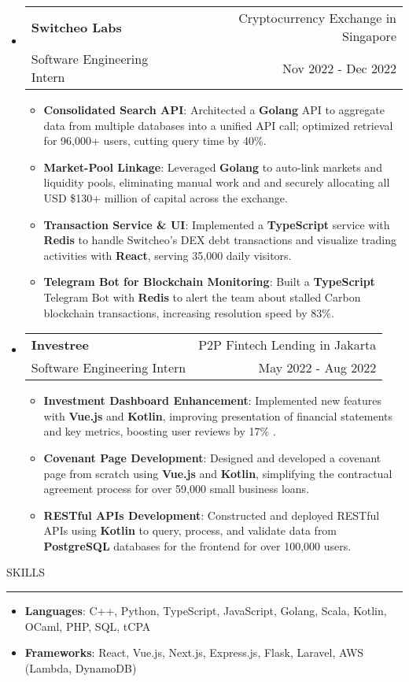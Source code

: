 \documentclass[letterpaper, 11pt]{article}
\makeatletter
\def\sectionlineskip{\medskip}
\def\sectionskip{\medskip}
\def \entryspacing {-0pt}
\newcommand{\SectionHeading}[1]{
  \sectionskip
  \raggedright\raggedbottom\MakeUppercase{\large{#1}}
  \sectionlineskip
  \hrule
  \color{black}
}
\newcommand{\ResumeEntryTSDL}[4]{
  \vspace{-1pt}\item
    \begin{tabular*}{\textwidth}[t]{l@{\extracolsep{\fill}}r} 
      \textbf{#1} & #2 \\
      #3 & #4 \\
    \end{tabular*}\vspace{-4pt}
}
\newcommand{\ResumeItem}[2]{
  \item{
    \textbf{#1}{: #2 \vspace{-2pt}}
  }
}
\newcommand{\ResumeSubItem}[2]{\ResumeItem{#1}{#2}\vspace{-4pt}}
\newcommand{\ResumeEntryStart}{\begin{itemize}[leftmargin=2mm, label={}]}
\newcommand{\ResumeEntryEnd}{\end{itemize}\vspace{-7pt}}
\newcommand{\ResumeItemListStart}{\begin{itemize}[leftmargin=5mm, label=$\bullet$]}
\newcommand{\ResumeItemListEnd}{\end{itemize}}
\newcommand{\ProjectItemListStart}{\begin{itemize}[leftmargin=*, label=$\bullet$]}
\newcommand{\ProjectItemListEnd}{\end{itemize}\vspace{\entryspacing}}
\makeatother
\begin{document}
  \ResumeEntryStart
    \ResumeEntryTSDL{Switcheo Labs}{Cryptocurrency Exchange in Singapore}{Software Engineering Intern}{Nov 2022 - Dec 2022}
    \ResumeItemListStart
    \ResumeItem{Consolidated Search API}
      {Architected a \textbf{Golang} API to aggregate data from multiple databases into a unified API call; optimized retrieval for 96,000+ users, cutting query time by 40\%.}
    \ResumeItem{Market-Pool Linkage}
      {Leveraged \textbf{Golang} to auto-link markets and liquidity pools, eliminating manual work and and securely allocating all USD \$130+ million of capital across the exchange.}
    \ResumeItem{Transaction Service \& UI}
      {Implemented a \textbf{TypeScript} service with \textbf{Redis} to handle Switcheo's DEX debt transactions and visualize trading activities with \textbf{React}, serving 35,000 daily visitors.}
    \ResumeItem{Telegram Bot for Blockchain Monitoring}
      {Built a \textbf{TypeScript} Telegram Bot with \textbf{Redis} to alert the team about stalled Carbon blockchain transactions, increasing resolution speed by 83\%.}
    \ResumeItemListEnd
  \ResumeEntryEnd

  \ResumeEntryStart
    \ResumeEntryTSDL{Investree}{P2P Fintech Lending in Jakarta}{Software Engineering Intern}{May 2022 - Aug 2022}
    \ResumeItemListStart
      \ResumeItem{Investment Dashboard Enhancement}
      {Implemented new features with \textbf{Vue.js} and \textbf{Kotlin}, improving presentation of financial statements and key metrics, boosting user reviews by 17\%}.
      \ResumeItem{Covenant Page Development}
        {Designed and developed a covenant page from scratch using \textbf{Vue.js} and \textbf{Kotlin}, simplifying the contractual agreement process for over 59,000 small business loans.}
      \ResumeItem{RESTful APIs Development}
        {Constructed and deployed RESTful APIs using \textbf{Kotlin} to query, process, and validate data from \textbf{PostgreSQL} databases for the frontend for over 100,000 users.}
    \ResumeItemListEnd
  \ResumeEntryEnd


  \SectionHeading{Skills}
  \ResumeEntryStart
    \ResumeItem{Languages}{C++, Python, TypeScript, JavaScript, Golang, Scala, Kotlin, OCaml, PHP, SQL, tCPA}
    \ResumeItem{Frameworks}{React, Vue.js, Next.js, Express.js, Flask, Laravel, AWS (Lambda, DynamoDB)}
  \ResumeEntryEnd
\end{document}

